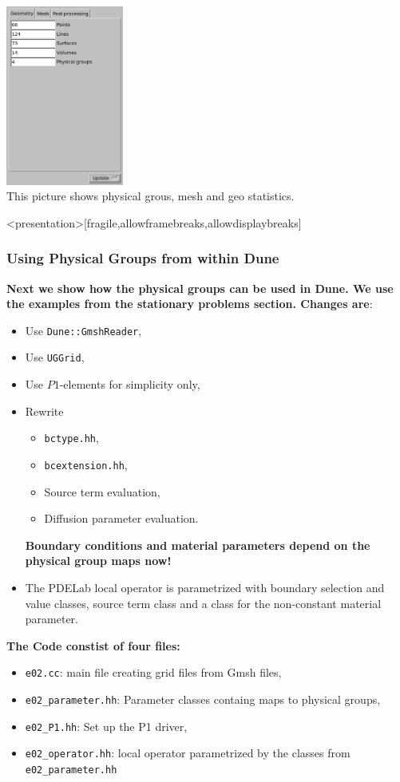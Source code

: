 \begin{frame}
\begin{center}
    \includegraphics[width=0.29\textwidth]{./EPS/L/L_geostatistics}\\
    This picture shows physical grous, mesh and geo statistics.
  \end{center}
\end{frame}

\begin{frame}<presentation>[fragile,allowframebreaks,allowdisplaybreaks]
  \frametitle{Using Physical Groups from within Dune}
  \textbf{Next we show how the physical groups can be used in Dune. We use the
  examples from the stationary problems section. Changes are}:
  \begin{itemize}
    \item Use \lstinline!Dune::GmshReader!,
    \item Use \lstinline!UGGrid!,
    \item Use $P1$-elements for simplicity only,
    \item Rewrite
      \begin{itemize}
        \item \lstinline!bctype.hh!,
        \item \lstinline!bcextension.hh!,
        \item Source term evaluation,
        \item Diffusion parameter evaluation.
      \end{itemize}
      \textbf{Boundary conditions and material parameters depend on the physical group
      maps now!}
    \item The PDELab local operator is parametrized with boundary selection and value
      classes, source term class and a class for the non-constant material
      parameter.
  \end{itemize}
  \textbf{The Code constist of four files:}
  \begin{itemize}
    \item \lstinline!e02.cc!: main file creating grid files from Gmsh files,
    \item \lstinline!e02_parameter.hh!: Parameter classes containg maps to
      physical groups,
    \item \lstinline!e02_P1.hh!: Set up the P1 driver,
    \item \lstinline!e02_operator.hh!: local operator parametrized by the
      classes from \lstinline!e02_parameter.hh!
  \end{itemize}
\end{frame}

